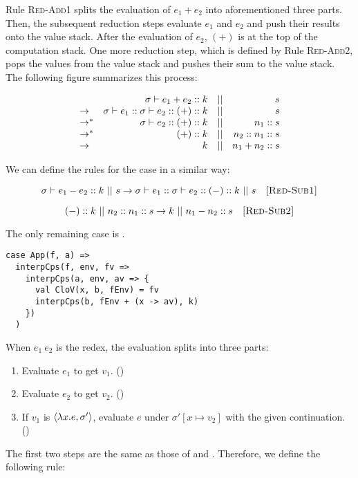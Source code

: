 Rule \textsc{Red-Add1} splits the evaluation of $e_1+e_2$ into aforementioned
three parts. Then, the subsequent reduction steps evaluate $e_1$ and $e_2$ and
push their results onto the value stack. After the evaluation of $e_2$, $(+)$
is at the top of the computation stack. One more reduction step, which is
defined by Rule \textsc{Red-Add2}, pops the values
from the value stack and pushes their sum to the value stack. The following
figure summarizes this process:

\[
\begin{array}{lrcr}
& \sigma\vdash e_1+e_2::k & || & s \\
\rightarrow & \sigma\vdash e_1::\sigma\vdash e_2::(+):: k & || & s \\
\rightarrow^\ast & \sigma\vdash e_2::(+):: k & || & n_1::s \\
\rightarrow^\ast & (+):: k & || & n_2::n_1::s \\
\rightarrow & k & || & n_1+n_2::s
\end{array}
\]

We can define the rules for the  case in a similar way:

\[
  \sigma\vdash e_1-e_2::k\ ||\ s\rightarrow \sigma\vdash e_1::\sigma\vdash e_2::(-):: k\ ||\ s
  \quad\textsc{[Red-Sub1]}
\]

\[
  \subk k\ ||\ \conss{n_2}\conss{n_1}s\rightarrow k\ ||\ \conss{n_1-n_2}s
  \quad\textsc{[Red-Sub2]}
\]

The only remaining case is .

\begin{verbatim}
case App(f, a) =>
  interpCps(f, env, fv =>
    interpCps(a, env, av => {
      val CloV(x, b, fEnv) = fv
      interpCps(b, fEnv + (x -> av), k)
    })
  )
\end{verbatim}

When $e_1\ e_2$ is the redex, the evaluation splits into three parts:
\begin{enumerate}
  \item Evaluate $e_1$ to get $v_1$. ()
  \item Evaluate $e_2$ to get $v_2$. ()
  \item If $v_1$ is $\langle\lambda x.e,\sigma'\rangle$,
    evaluate $e$ under $\sigma'[x\mapsto v_2]$ with the given continuation.
    ()
\end{enumerate}

The first two steps are the same as those of  and .
Therefore, we define the following rule:

